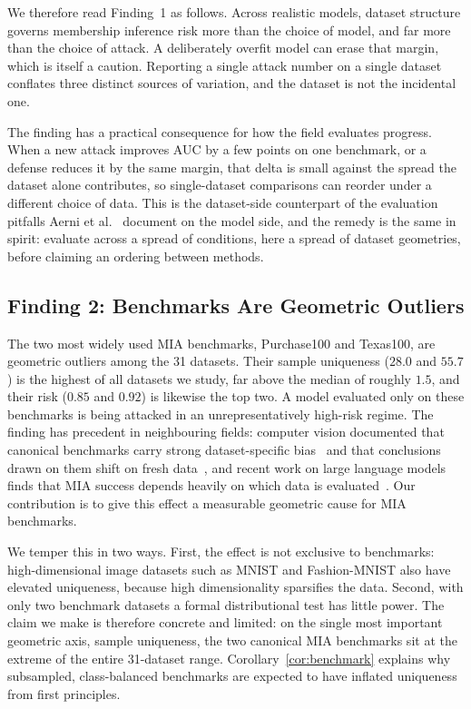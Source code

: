 We therefore read Finding~1 as follows. Across realistic models, dataset
structure governs membership inference risk more than the choice of model,
and far more than the choice of attack. A deliberately overfit model can
erase that margin, which is itself a caution. Reporting a single attack
number on a single dataset conflates three distinct sources of variation,
and the dataset is not the incidental one.

The finding has a practical consequence for how the field evaluates
progress. When a new attack improves AUC by a few points on one
benchmark, or a defense reduces it by the same margin, that delta is
small against the spread the dataset alone contributes, so
single-dataset comparisons can reorder under a different choice of
data. This is the dataset-side counterpart of the evaluation pitfalls
Aerni et al.~\cite{aerni2024evaluations} document on the model side,
and the remedy is the same in spirit: evaluate across a spread of
conditions, here a spread of dataset geometries, before claiming an
ordering between methods.

\subsection{Finding 2: Benchmarks Are Geometric Outliers}
\label{sec:finding2}

The two most widely used MIA benchmarks, Purchase100 and Texas100, are
geometric outliers among the 31 datasets. Their sample uniqueness ($28.0$
and $55.7$) is the highest of all datasets we study, far above the median
of roughly $1.5$, and their risk ($0.85$ and $0.92$) is likewise the top
two. A model evaluated only on these benchmarks is being attacked in an
unrepresentatively high-risk regime.
The finding has precedent in neighbouring fields: computer vision
documented that canonical benchmarks carry strong dataset-specific
bias~\cite{torralba2011unbiased} and that conclusions drawn on them
shift on fresh data~\cite{recht2019imagenet}, and recent work on large
language models finds that MIA success depends heavily on which data is
evaluated~\cite{duan2024membership}. Our contribution is to give this
effect a measurable geometric cause for MIA benchmarks.

We temper this in two ways. First, the effect is not exclusive to
benchmarks: high-dimensional image datasets such as MNIST and Fashion-MNIST
also have elevated uniqueness, because high dimensionality sparsifies the
data. Second, with only two benchmark datasets a formal distributional test
has little power. The claim we make is therefore concrete and limited:
on the single most important geometric axis, sample uniqueness, the two
canonical MIA benchmarks sit at the extreme of the entire 31-dataset range.
Corollary~\ref{cor:benchmark} explains why subsampled, class-balanced
benchmarks are expected to have inflated uniqueness from first principles.

